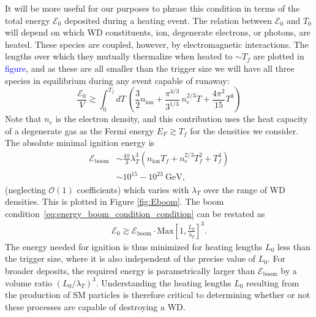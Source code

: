 \documentclass[twocolumn,preprintnumbers,amsmath,amssymb,prd, superscriptaddress]{revtex4} %
\newcommand{\Ez}{\mathcal{E}_0}
\newcommand{\Eboom}{\mathcal{E}_\text{boom}}
\newcommand{\GeV}{\text{GeV}}
\begin{document}
It will be more useful for our purposes to phrase this condition in terms of the total energy $\Ez$ deposited during a heating event.
The relation between $\Ez$ and $T_0$ will depend on which WD constituents, ion, degenerate electrons, or photons, are heated.
These species are coupled, however, by electromagnetic interactions.
The lengths over which they mutually thermalize when heated to $\sim T_f$ are plotted in \textcolor{blue}{figure}, and as these are all smaller than the trigger size we will have all three species in equilibrium during any event capable of runaway:
\begin{equation}
  \frac{\Ez}{V} \gtrsim \int_0^{T_f} dT ~\left(\frac32 n_\text{ion} + \frac{\pi^{4/3}}{3^{1/3}}\, n_e^{2/3} T + \frac{4 \pi^2}{15} T^3 \right)
\end{equation}
Note that $n_e$ is the electron density, and this contribution uses the heat capacity of a degenerate gas as the Fermi energy $E_F \gtrsim T_f$ for the densities we consider.
The absolute minimal ignition energy is
\begin{align}
\label{eq:Eboom}
\Eboom &\sim \frac{4 \pi}{3} \lambda_T^3 (n_\text{ion} T_f + n_e^{2/3} T_f^2 + T_f^4) \\
         &\sim  10^{15} - 10^{23} ~\GeV \nonumber,
\end{align}
(neglecting $\mathcal{O}(1)$ coefficients) which varies with $\lambda_T$ over the range of WD densities. %
This is plotted in Figure \ref{fig:Eboom}.
The boom condition~\eqref{eq:energy_boom_condition_condition} can be restated as
\begin{align}
    \label{eq:energy_boom_condition}
    \Ez \gtrsim
    \Eboom \cdot \text{Max}\left[1, \frac{L_0}{\lambda_T}\right]^3.
\end{align}
The energy needed for ignition is thus minimized for heating lengths $L_0$ less than the trigger size, where it is also independent of the precise value of $L_0$.
For broader deposits, the required energy is parametrically larger than $\Eboom$ by a volume ratio $(L_0/\lambda_T)^3$.
Understanding the heating lengths $L_0$ resulting from the production of SM particles is therefore critical to determining whether or not these processes are capable of destroying a WD.
\end{document}
